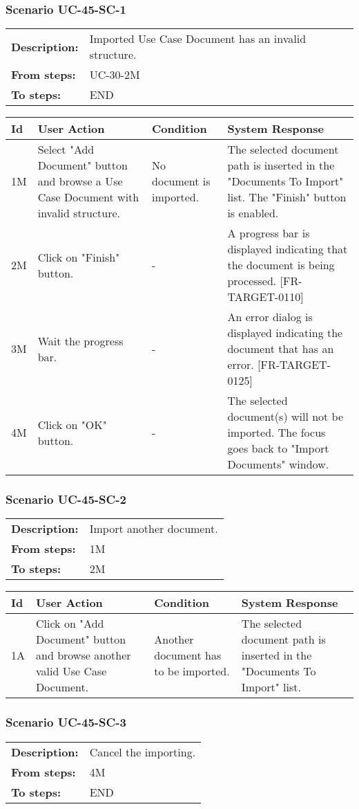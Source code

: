 \documentclass[a4paper,11pt]{article}
\newcommand{\bl}{\\ \hline}
\begin{document}
\subsubsection*{Scenario UC-45-SC-1}
\begin{tabular}{p{1in}p{4in}}
{\bf Description:} & Imported Use Case Document has an invalid structure. \\
{\bf From steps:} & UC-30-2M \\
{\bf To steps:} & END \\
\end{tabular}
 
\begin{tabular}{|p{0.8in}|p{1.6in}|p{1.6in}|p{1.6in}|}
\hline
Id & User Action & Condition & System Response  \bl 
1M & Select "Add Document" button and browse a Use Case Document with invalid structure. & No document is imported. & The selected document path is inserted in the "Documents To Import" list. The "Finish" button is enabled. \bl 
2M & Click on "Finish" button. & - & A progress bar is displayed indicating that the document is being processed. [FR-TARGET-0110] \bl 
3M & Wait the progress bar. & - & An error dialog is displayed indicating the document that has an error. [FR-TARGET-0125] \bl 
4M & Click on "OK" button. & - & The selected document(s) will not be imported. The focus goes back to "Import Documents" window. \bl 
\end{tabular}
\subsubsection*{Scenario UC-45-SC-2}
\begin{tabular}{p{1in}p{4in}}
{\bf Description:} & Import another document. \\
{\bf From steps:} & 1M \\
{\bf To steps:} & 2M \\
\end{tabular}
 
\begin{tabular}{|p{0.8in}|p{1.6in}|p{1.6in}|p{1.6in}|}
\hline
Id & User Action & Condition & System Response  \bl 
1A & Click on "Add Document" button and browse another valid Use Case Document. & Another document has to be imported. & The selected document path is inserted in the "Documents To Import" list. \bl 
\end{tabular}
\subsubsection*{Scenario UC-45-SC-3}
\begin{tabular}{p{1in}p{4in}}
{\bf Description:} & Cancel the importing. \\
{\bf From steps:} & 4M \\
{\bf To steps:} & END \\
\end{tabular}
 
\end{document}
